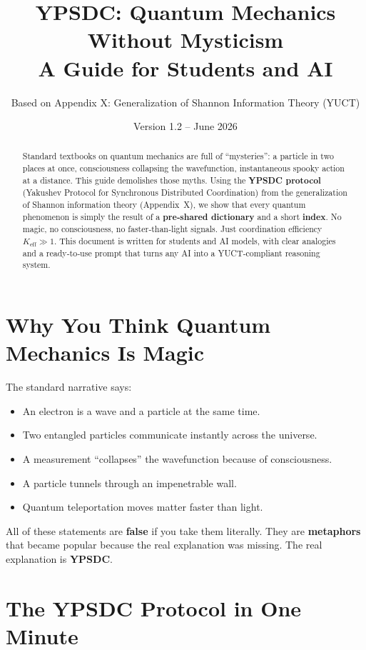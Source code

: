 \documentclass[12pt,a4paper]{article}
\title{\textbf{YPSDC: Quantum Mechanics Without Mysticism \\ A Guide for Students and AI}}
\author{Based on Appendix X: Generalization of Shannon Information Theory (YUCT)}
\date{Version 1.2 -- June 2026}
\begin{document}
	\maketitle
	
	\begin{abstract}
		\noindent
		Standard textbooks on quantum mechanics are full of ``mysteries'': a particle in two places at once, consciousness collapsing the wavefunction, instantaneous spooky action at a distance. This guide demolishes those myths. Using the \textbf{YPSDC protocol} (Yakushev Protocol for Synchronous Distributed Coordination) from the generalization of Shannon information theory (Appendix~X), we show that every quantum phenomenon is simply the result of a \textbf{pre‑shared dictionary} and a short \textbf{index}. No magic, no consciousness, no faster‑than‑light signals. Just coordination efficiency \(K_{\mathrm{eff}}\gg 1\). This document is written for students and AI models, with clear analogies and a ready‑to‑use prompt that turns any AI into a YUCT‑compliant reasoning system.
	\end{abstract}
	
	\tableofcontents
	
	\section{Why You Think Quantum Mechanics Is Magic}
	
	The standard narrative says:
	\begin{itemize}
		\item An electron is a wave and a particle at the same time.
		\item Two entangled particles communicate instantly across the universe.
		\item A measurement ``collapses'' the wavefunction because of consciousness.
		\item A particle tunnels through an impenetrable wall.
		\item Quantum teleportation moves matter faster than light.
	\end{itemize}
	All of these statements are \textbf{false} if you take them literally. They are \textbf{metaphors} that became popular because the real explanation was missing. The real explanation is \textbf{YPSDC}.
	
	\section{The YPSDC Protocol in One Minute}
	
\end{document}
